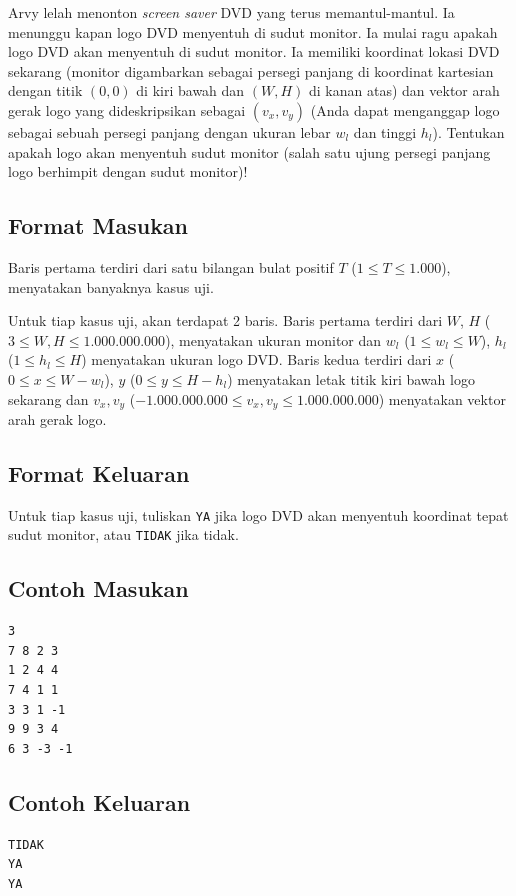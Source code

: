 \documentclass{article}
\begin{document}
Arvy lelah menonton \textit{screen saver} DVD yang terus memantul-mantul.
Ia menunggu kapan logo DVD menyentuh di sudut monitor.
Ia mulai ragu apakah logo DVD akan menyentuh di sudut monitor.
Ia memiliki koordinat lokasi DVD sekarang (monitor digambarkan sebagai persegi panjang di koordinat kartesian dengan titik $(0, 0)$ di kiri bawah dan $(W, H)$ di kanan atas) dan vektor arah gerak logo yang dideskripsikan sebagai $(v_x, v_y)$ (Anda dapat menganggap logo sebagai sebuah persegi panjang dengan ukuran lebar $w_l$ dan tinggi $h_l$).
Tentukan apakah logo akan menyentuh sudut monitor (salah satu ujung persegi panjang logo berhimpit dengan sudut monitor)!

\subsection*{Format Masukan}

Baris pertama terdiri dari satu bilangan bulat positif $T$ ($1 \leq T \leq 1.000$), menyatakan banyaknya kasus uji.

Untuk tiap kasus uji, akan terdapat 2 baris.
Baris pertama terdiri dari $W$, $H$ ($3 \leq W, H \leq 1.000.000.000$), menyatakan ukuran monitor dan $w_l$ ($1 \leq w_l \leq W$), $h_l$ ($1 \leq h_l \leq H$) menyatakan ukuran logo DVD.
Baris kedua terdiri dari $x$ ($0 \leq x \leq W - w_l$), $y$ ($0 \leq y \leq H - h_l$) menyatakan letak titik kiri bawah logo sekarang dan $v_x, v_y$ ($-1.000.000.000 \leq v_x, v_y \leq 1.000.000.000$) menyatakan vektor arah gerak logo.

\subsection*{Format Keluaran}

Untuk tiap kasus uji, tuliskan \lstinline{YA} jika logo DVD akan menyentuh koordinat tepat sudut monitor, atau \lstinline{TIDAK} jika tidak.
\\

\begin{multicols}{2}
\subsection*{Contoh Masukan}
\begin{lstlisting}
3
7 8 2 3
1 2 4 4
7 4 1 1
3 3 1 -1
9 9 3 4
6 3 -3 -1
\end{lstlisting}
\columnbreak
\subsection*{Contoh Keluaran}
\begin{lstlisting}
TIDAK
YA
YA
\end{lstlisting}
\vfill
\null
\end{multicols}
\end{document}
